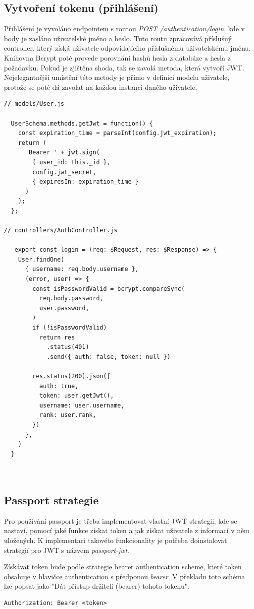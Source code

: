 \documentclass[thesis=M,czech]{FITthesis}[2018/10/20]
\begin{document}
\newpage
\subsection{Vytvoření tokenu (přihlášení)}
Přihlášení je vyvoláno endpointem s routou \textit{POST /authentication/login}, kde v body je zasláno uživatelské jméno a heslo. Tuto routu zpracovává příslušný controller, který získá uživatele odpovídajícího příslušnému uživatelskému jménu. Knihovna Bcrypt poté provede porovnání hashů hesla z databáze a hesla z požadavku. Pokud je zjištěna shoda, tak se zavolá metoda, která vytvoří JWT. Nejelegantnější umístění této metody je přímo v definici modelu uživatele, protože se poté dá zavolat na každou instanci daného uživatele.

\begin{lstlisting}
// models/User.js

  UserSchema.methods.getJwt = function() {
    const expiration_time = parseInt(config.jwt_expiration);
    return (
      'Bearer ' + jwt.sign(
      	{ user_id: this._id }, 
      	config.jwt_secret, 
      	{ expiresIn: expiration_time }
      )
    );  
  };
 
// controllers/AuthController.js 

   export const login = (req: $Request, res: $Response) => {
    User.findOne(
      { username: req.body.username },
      (error, user) => {
        const isPasswordValid = bcrypt.compareSync(
          req.body.password,
          user.password,
        )
        if (!isPasswordValid)
          return res
            .status(401)
            .send({ auth: false, token: null })
  
        res.status(200).json({
          auth: true,
          token: user.getJwt(),
          username: user.username,
          rank: user.rank,
        })
      }, 
    )
  }



\end{lstlisting}

\newpage
\subsection{Passport strategie}
	Pro používání passport je třeba implementovat vlastní JWT strategii, kde se nastaví, pomocí jaké funkce získat token a jak získat uživatele z informací v něm uložených. K implementaci takovéto funkcionality je potřeba doinstalovat strategií pro JWT s názvem \textit{passport-jwt}.

Získávat token bude podle strategie bearer authentication scheme, které token obsahuje v hlavičce authentication s předponou \textit{bearer}. V překladu toto schéma lze popsat jako "Dát přístup držiteli (bearer) tohoto tokenu"\cite{bearer}.
\begin{lstlisting}
Authorization: Bearer <token>
\end{lstlisting}
\end{document}
